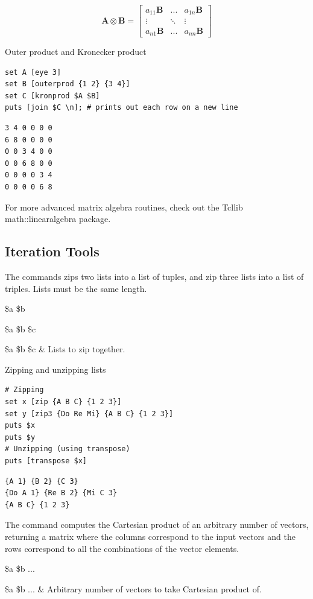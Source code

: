 \begin{equation}\label{eq:kronprod}
\bm{A} \otimes \bm{B} = \left[\begin{matrix}
a_{11}\bm{B} & ... & a_{1n}\bm{B} \\
\vdots & \ddots & \vdots \\
a_{n1}\bm{B} & ... & a_{nn}\bm{B}
\end{matrix}\right]
\end{equation}
\begin{example}{Outer product and Kronecker product}
\begin{lstlisting}
set A [eye 3]
set B [outerprod {1 2} {3 4}]
set C [kronprod $A $B]
puts [join $C \n]; # prints out each row on a new line
\end{lstlisting}
\tcblower
\begin{lstlisting}
3 4 0 0 0 0
6 8 0 0 0 0
0 0 3 4 0 0
0 0 6 8 0 0
0 0 0 0 3 4
0 0 0 0 6 8
\end{lstlisting}
\end{example}
For more advanced matrix algebra routines, check out the Tcllib math::linearalgebra package.
\clearpage
\subsection{Iteration Tools}
The commands  zips two lists into a list of tuples, and  zip three lists into a list of triples. 
Lists must be the same length.
\begin{syntax}
 \$a \$b
\end{syntax}
\begin{syntax}
 \$a \$b \$c
\end{syntax}
\begin{args}
\$a \$b \$c & Lists to zip together.
\end{args}
\begin{example}{Zipping and unzipping lists}
\begin{lstlisting}
# Zipping
set x [zip {A B C} {1 2 3}]
set y [zip3 {Do Re Mi} {A B C} {1 2 3}]
puts $x
puts $y
# Unzipping (using transpose)
puts [transpose $x]
\end{lstlisting}
\tcblower
\begin{lstlisting}
{A 1} {B 2} {C 3}
{Do A 1} {Re B 2} {Mi C 3}
{A B C} {1 2 3}
\end{lstlisting}
\end{example}
The command  computes the Cartesian product of an arbitrary number of vectors, returning a matrix where the columns correspond to the input vectors and the rows correspond to all the combinations of the vector elements.
\begin{syntax}
 \$a \$b ...
\end{syntax}
\begin{args}
\$a \$b ... & Arbitrary number of vectors to take Cartesian product of.
\end{args}


